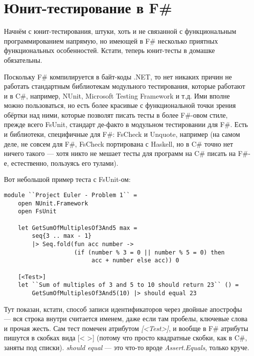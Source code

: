 \documentclass{../../text-style}
\begin{document}
\maketitle
\thispagestyle{empty}

\section{Юнит-тестирование в F\#}

Начнём с юнит-тестирования, штуки, хоть и не связанной с функциональным программированием напрямую, но имеющей в F\# несколько приятных функциональных особенностей. Кстати, теперь юнит-тесты в домашке обязательны.

Поскольку F\# компилируется в байт-коды .NET, то нет никаких причин не работать стандартным библиотекам модульного тестирования, которые работают и в C\#, например, NUnit, Microsoft Testing Framework и т.д. Ими вполне можно пользоваться, но есть более красивые с функциональной точки зрения обёртки над ними, которые позволят писать тесты в более F\#-овом стиле, прежде всего FsUnit, стандарт де-факто в модульном тестировании для F\#. Есть и библиотеки, специфичные для F\#: FsCheck и Unquote, например (на самом деле, не совсем для F\#, FsCheck портирована с Haskell, но в C\# точно нет ничего такого --- хотя никто не мешает тесты для программ на C\# писать на F\#-е, естественно, пользуясь его тулами).

Вот небольшой пример теста с FsUnit-ом:

\begin{verbatim}
module ``Project Euler - Problem 1`` =
    open NUnit.Framework
    open FsUnit

    let GetSumOfMultiplesOf3And5 max =
        seq{3 .. max - 1} 
        |> Seq.fold(fun acc number ->
                    (if (number % 3 = 0 || number % 5 = 0) then
                         acc + number else acc)) 0

    [<Test>]
    let ``Sum of multiples of 3 and 5 to 10 should return 23`` () =
        GetSumOfMultiplesOf3And5(10) |> should equal 23
\end{verbatim}

Тут показан, кстати, способ записи идентификаторов через двойные апострофы --- вся строка внутри считается именем, даже если там пробелы, ключевые слова и прочая жесть. Сам тест помечен атрибутом \textit{[<Test>]}, и вообще в F\# атрибуты пишутся в скобках вида [< >] (потому что просто квадратные скобки, как в C\#, заняты под списки). \textit{should equal} --- это что-то вроде \textit{Assert.Equals}, только круче.
\end{document}
